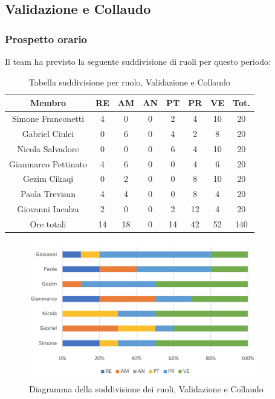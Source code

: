 \subsection{Validazione e Collaudo}
\subsubsection{Prospetto orario}
Il team ha previsto la seguente suddivisione di ruoli per questo periodo:
\begin{table}[h]
\caption{Tabella suddivisione per ruolo, Validazione e Collaudo}
\begin{center}
\begin{tabular}{ |c|c|c|c|c|c|c|c|  }
 \hline
 Membro 		& RE 	& AM 	& AN 	& PT 	& PR 	& VE 	& Tot.\\
 \hline\hline
 Simone Franconetti			& 4 		& 0		& 0 	& 2 		& 4 		& 10 		& 20\\
 Gabriel Ciulei		& 0 		& 6 		& 0 	& 4		& 2 		& 8 		& 20\\
 Nicola	Salvadore		& 0 		& 0 		& 0 	& 6 		& 4 		& 10 		& 20\\
 Gianmarco Pettinato		& 4 		& 6 		& 0 	& 0	 	& 4 		& 6 		& 20\\
 Gezim Cikaqi			& 0 		& 2 		& 0 	& 0 		& 8 		& 10	 	& 20\\
 Paola Trevisan			& 4 		& 4 		& 0 	& 0 		& 8 		& 4 		& 20\\
 Giovanni Incalza		& 2 		& 0	 	& 0 	& 2 		& 12 	& 4  	& 20\\
 \hline\hline
 Ore totali		& 14		& 18		& 0 	& 14	 	& 42 	& 52 	& 140\\
  \hline
\end{tabular}
\end{center}
\end{table}
\begin{figure}[h!]
	\centering
	\includegraphics[width=0.9\textwidth]{res/img/hi5}
	\caption{Diagramma della suddivisione dei ruoli, Validazione e Collaudo}
\end{figure}

